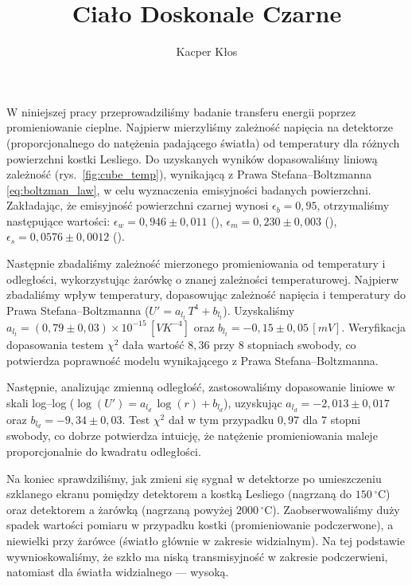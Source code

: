 \documentclass[12pt]{article}
\title{Ciało Doskonale Czarne}
\author{Kacper Kłos}
\begin{document}
\maketitle

W niniejszej pracy przeprowadziliśmy badanie transferu energii poprzez promieniowanie cieplne. Najpierw mierzyliśmy zależność napięcia na detektorze (proporcjonalnego do natężenia padającego światła) od temperatury dla różnych powierzchni kostki Lesliego. Do uzyskanych wyników dopasowaliśmy liniową zależność (rys.~\ref{fig:cube_temp}), wynikającą z Prawa Stefana–Boltzmanna \eqref{eq:boltzman_law}, w celu wyznaczenia emisyjności badanych powierzchni. Zakładając, że emisyjność powierzchni czarnej wynosi $\epsilon_b = 0{,}95$, otrzymaliśmy następujące wartości: $\epsilon_w = 0{,}946 \pm 0{,}011$ (), $\epsilon_m = 0{,}230 \pm 0{,}003$ (), $\epsilon_s = 0{,}0576 \pm 0{,}0012$ ().

Następnie zbadaliśmy zależność mierzonego promieniowania od temperatury i odległości, wykorzystując żarówkę o znanej zależności temperaturowej. Najpierw zbadaliśmy wpływ temperatury, dopasowując zależność napięcia i temperatury do Prawa Stefana–Boltzmanna ($U' = a_{l_t}\,T^4 + b_{l_t}$). Uzyskaliśmy $a_{l_t} = (0{,}79 \pm 0{,}03) \times 10^{-15}\,[VK^{-4}]$ oraz $b_{l_t} = -0{,}15 \pm 0{,}05\,[mV]$.
Weryfikacja dopasowania testem $\chi^2$ dała wartość $8{,}36$ przy $8$ stopniach swobody, co potwierdza poprawność modelu wynikającego z Prawa Stefana–Boltzmanna. 

Następnie, analizując zmienną odległość, zastosowaliśmy dopasowanie liniowe w skali log–log ($\log(U') = a_{l_d}\,\log(r) + b_{l_d}$), uzyskując $a_{l_d} = -2{,}013 \pm 0{,}017$ oraz $b_{l_d} = -9{,}34 \pm 0{,}03$.
Test $\chi^2$ dał w tym przypadku $0{,}97$ dla $7$ stopni swobody, co dobrze potwierdza intuicję, że natężenie promieniowania maleje proporcjonalnie do kwadratu odległości. 

Na koniec sprawdziliśmy, jak zmieni się sygnał w detektorze po umieszczeniu szklanego ekranu pomiędzy detektorem a kostką Lesliego (nagrzaną do $150\,^\circ\mathrm{C}$) oraz detektorem a żarówką (nagrzaną powyżej $2000\,^\circ\mathrm{C}$). Zaobserwowaliśmy duży spadek wartości pomiaru w przypadku kostki (promieniowanie podczerwone), a niewielki przy żarówce (światło głównie w zakresie widzialnym). Na tej podstawie wywnioskowaliśmy, że szkło ma niską transmisyjność w zakresie podczerwieni, natomiast dla światła widzialnego — wysoką.
\end{document}
